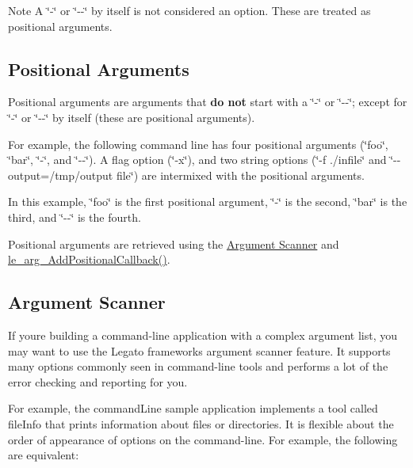 \begin{DoxyNote}{Note}
A \char`\"{}-\/\char`\"{} or \char`\"{}-\/-\/\char`\"{} by itself is not considered an option. These are treated as positional arguments.
\end{DoxyNote}
\hypertarget{c_args_c_args_positional}{}\subsection{Positional Arguments}\label{c_args_c_args_positional}
Positional arguments are arguments that {\bfseries do not} start with a \char`\"{}-\/\char`\"{} or \char`\"{}-\/-\/\char`\"{}; except for \char`\"{}-\/\char`\"{} or \char`\"{}-\/-\/\char`\"{} by itself (these are positional arguments).

For example, the following command line has four positional arguments (\char`\"{}foo\char`\"{}, \char`\"{}bar\char`\"{}, \char`\"{}-\/\char`\"{}, and \char`\"{}-\/-\/\char`\"{}). A flag option (\char`\"{}-\/x\char`\"{}), and two string options (\char`\"{}-\/f ./infile\char`\"{} and \char`\"{}-\/-\/output=/tmp/output file\char`\"{}) are intermixed with the positional arguments.




In this example, \char`\"{}foo\char`\"{} is the first positional argument, \char`\"{}-\/\char`\"{} is the second, \char`\"{}bar\char`\"{} is the third, and \char`\"{}-\/-\/\char`\"{} is the fourth.

Positional arguments are retrieved using the \hyperlink{c_args_c_args_scanner}{Argument Scanner} and \hyperlink{le__args_8h_a525bef6095a4655e97008e27a4829d44}{le\+\_\+arg\+\_\+\+Add\+Positional\+Callback()}.\hypertarget{c_args_c_args_scanner}{}\subsection{Argument Scanner}\label{c_args_c_args_scanner}
If you\textquotesingle{}re building a command-\/line application with a complex argument list, you may want to use the Legato framework\textquotesingle{}s argument scanner feature. It supports many options commonly seen in command-\/line tools and performs a lot of the error checking and reporting for you.

For example, the {\ttfamily command\+Line} sample application implements a tool called {\ttfamily file\+Info} that prints information about files or directories. It is flexible about the order of appearance of options on the command-\/line. For example, the following are equivalent\+:


